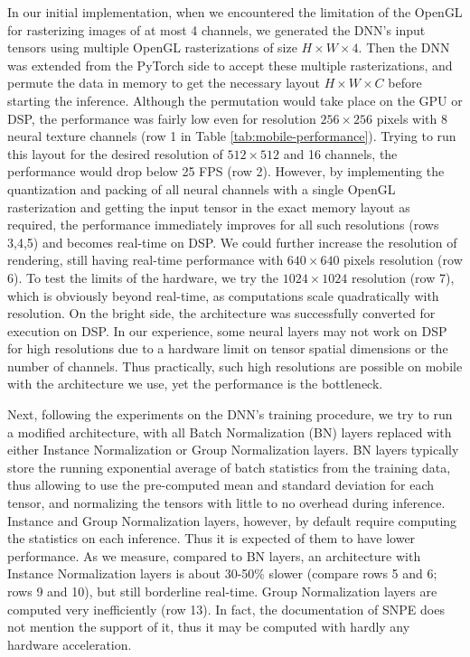 In our initial implementation, when we encountered the limitation of the OpenGL for rasterizing images of at most 4 channels, we generated the DNN's input tensors using multiple OpenGL rasterizations of size $H \times W \times 4$. Then the DNN was extended from the PyTorch side to accept these multiple rasterizations, and permute the data in memory to get the necessary layout $H \times W \times C$ before starting the inference. Although the permutation would take place on the GPU or DSP, the performance was fairly low even for resolution $256 \times 256$ pixels with 8 neural texture channels (row 1 in Table \ref{tab:mobile-performance}). Trying to run this layout for the desired resolution of $512 \times 512$ and 16 channels, the performance would drop below 25 FPS (row 2). However, by implementing the quantization and packing of all neural channels with a single OpenGL rasterization and getting the input tensor in the exact memory layout as required, the performance immediately improves for all such resolutions (rows 3,4,5) and becomes real-time on DSP. We could further increase the resolution of rendering, still having real-time performance with $640 \times 640$ pixels resolution (row 6). To test the limits of the hardware, we try the $1024 \times 1024$ resolution (row 7), which is obviously beyond real-time, as computations scale quadratically with resolution. On the bright side, the architecture was successfully converted for execution on DSP. In our experience, some neural layers may not work on DSP for high resolutions due to a hardware limit on tensor spatial dimensions or the number of channels. Thus practically, such high resolutions are possible on mobile with the architecture we use, yet the performance is the bottleneck. 

Next, following the experiments on the DNN's training procedure, we try to run a modified architecture, with all Batch Normalization (BN) layers replaced with either Instance Normalization or Group Normalization layers. BN layers typically store the running exponential average of batch statistics from the training data, thus allowing to use the pre-computed mean and standard deviation for each tensor, and normalizing the tensors with little to no overhead during inference. Instance and Group Normalization layers, however, by default require computing the statistics on each inference. Thus it is expected of them to have lower performance. As we measure, compared to BN layers, an architecture with Instance Normalization layers is about 30-50\% slower (compare rows 5 and 6; rows 9 and 10), but still borderline real-time. Group Normalization layers are computed very inefficiently (row 13). In fact, the documentation of SNPE does not mention the support of it, thus it may be computed with hardly any hardware acceleration.


